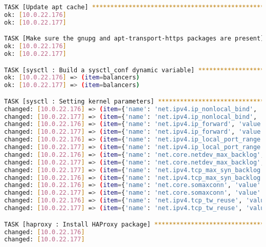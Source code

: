 \begin{flushleft}
\begin{lstlisting}[language=bash, caption=Deploy - Anhang - Deployt,captionpos=b,label={lst:deploy-appendix-deployt},breaklines=true]
TASK [Update apt cache] *******************************************************************************************************************************************************************************************
ok: [10.0.22.176]
ok: [10.0.22.177]

TASK [Make sure the gnupg and apt-transport-https packages are present] *******************************************************************************************************************************************
ok: [10.0.22.176]
ok: [10.0.22.177]

TASK [sysctl : Build a sysctl_conf dynamic variable] **************************************************************************************************************************************************************
ok: [10.0.22.176] => (item=balancers)
ok: [10.0.22.177] => (item=balancers)

TASK [sysctl : Setting kernel parameters] *************************************************************************************************************************************************************************
changed: [10.0.22.176] => (item={'name': 'net.ipv4.ip_nonlocal_bind', 'value': '1'})
changed: [10.0.22.177] => (item={'name': 'net.ipv4.ip_nonlocal_bind', 'value': '1'})
changed: [10.0.22.176] => (item={'name': 'net.ipv4.ip_forward', 'value': '1'})
changed: [10.0.22.177] => (item={'name': 'net.ipv4.ip_forward', 'value': '1'})
changed: [10.0.22.176] => (item={'name': 'net.ipv4.ip_local_port_range', 'value': '10000 65535'})
changed: [10.0.22.177] => (item={'name': 'net.ipv4.ip_local_port_range', 'value': '10000 65535'})
changed: [10.0.22.176] => (item={'name': 'net.core.netdev_max_backlog', 'value': '10000'})
changed: [10.0.22.177] => (item={'name': 'net.core.netdev_max_backlog', 'value': '10000'})
changed: [10.0.22.177] => (item={'name': 'net.ipv4.tcp_max_syn_backlog', 'value': '8192'})
changed: [10.0.22.176] => (item={'name': 'net.ipv4.tcp_max_syn_backlog', 'value': '8192'})
changed: [10.0.22.176] => (item={'name': 'net.core.somaxconn', 'value': '65535'})
changed: [10.0.22.177] => (item={'name': 'net.core.somaxconn', 'value': '65535'})
changed: [10.0.22.176] => (item={'name': 'net.ipv4.tcp_tw_reuse', 'value': '1'})
changed: [10.0.22.177] => (item={'name': 'net.ipv4.tcp_tw_reuse', 'value': '1'})

TASK [haproxy : Install HAProxy package] **************************************************************************************************************************************************************************
changed: [10.0.22.176]
changed: [10.0.22.177]


\end{lstlisting}
\end{flushleft}
